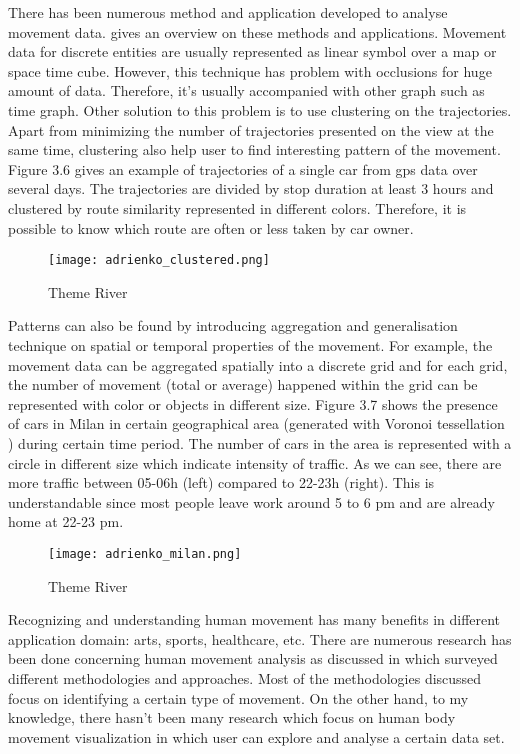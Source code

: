 There has been numerous method and application developed to analyse movement data. \cite{adrienko} gives an overview on these methods and applications. Movement data for discrete entities are usually represented as linear symbol over a map or space time cube. However, this technique has problem with occlusions for huge amount of data. Therefore, it's usually accompanied with other graph such as time graph. Other solution to this problem is to use clustering on the trajectories. Apart from minimizing the number of trajectories presented on the view at the same time, clustering also help user to find interesting pattern of the movement. Figure 3.6 \cite{adrienko_book} gives an example of trajectories of a single car from gps data over several days. The trajectories are divided by stop duration at least 3 hours and clustered by route similarity represented in different colors. Therefore, it is possible to know which route are often or less taken by car owner.

\begin{figure}
\centering
\texttt{[image: adrienko\_clustered.png]}
\caption{Theme River}
\end{figure}

Patterns can also be found by introducing aggregation and generalisation technique on spatial or temporal properties of the movement. For example, the movement data can be aggregated spatially into a discrete grid and for each grid, the number of movement (total or average) happened within the grid can be represented with color or objects in different size. Figure 3.7 \cite{adrienko_book} shows the presence of cars in Milan in certain geographical area (generated with Voronoi tessellation \cite{okabe}) during certain time period. The number of cars in the area is represented with a circle in different size which indicate intensity of traffic. As we can see, there are more traffic between 05-06h (left) compared to 22-23h (right). This is understandable since most people leave work around 5  to 6 pm and are already home at 22-23 pm.

\begin{figure}
\centering
\texttt{[image: adrienko\_milan.png]}
\caption{Theme River}
\end{figure}

Recognizing and understanding human movement has many benefits in different application domain: arts\cite{heryadi,raptis}, sports\cite{bernard2013}, healthcare\cite{patsadu}, etc. There are numerous research has been done concerning human movement analysis as discussed in  \cite{gavrila} which surveyed different methodologies and approaches. Most of the methodologies discussed focus on identifying a certain type of movement. On the other hand, to my knowledge, there hasn't been many research which focus on human body movement visualization in which user can explore and analyse a certain data set. 

